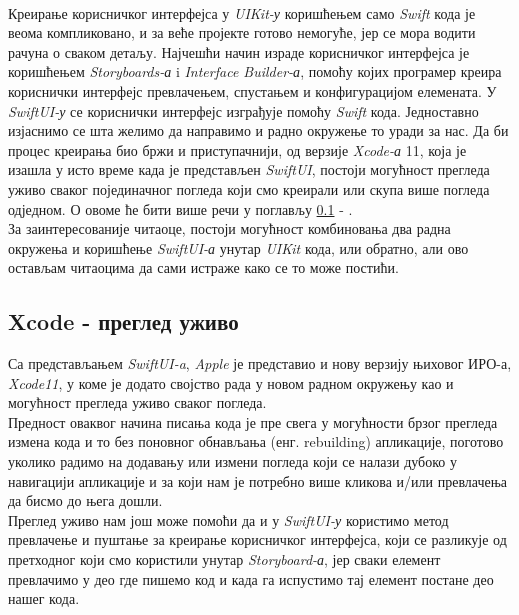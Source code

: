 \documentclass[12pt,oneside]{memoir}
\begin{document}
\\
\indent Креирање корисничког интерфејса у \textit{UIKit-у} коришћењем само \textit{Swift} кода је веома компликовано, и за веће пројекте готово немогуће, јер се мора водити рачуна о сваком детаљу. Најчешћи начин израде корисничког интерфејса је коришћењем \textit{Storyboards-а} i \textit{Interface Builder-а}, помоћу којих програмер креира кориснички интерфејс превлачењем, спустањем и конфигурацијом елемената. У \textit{SwiftUI-у} се кориснички интерфејс изграђује помоћу \textit{Swift} кода. Једноставно изјаснимо се шта желимо да направимо и радно окружење то уради за нас. Да би процес креирања био бржи и приступачнији, од верзије \textit{Xcode-а} 11, која је изашла у исто време када је представљен \textit{SwiftUI}, постоји могућност прегледа уживо сваког појединачног погледа који смо креирали или скупа више погледа одједном. О овоме ће бити више речи у поглављу \ref{subsec:Xcode - преглед уживо} - .
\\
\indent За заинтересованије читаоце, постоји могућност комбиновања два радна окружења и коришћење \textit{SwiftUI-а} унутар \textit{UIKit} кода, или обратно, али ово остављам читаоцима да сами истраже како се то може постићи.

\subsection{Xcode - преглед уживо}
\label{subsec:Xcode - преглед уживо}

\indent Са представљањем \textit{SwiftUI-a}, \textit{Apple} је представио и нову верзију њиховог ИРО-а, \textit{Xcode11}, у коме је додато својство рада у новом радном окружењу као и могућност прегледа уживо сваког погледа. 
\\
\indent Предност оваквог начина писања кода је пре свега у могућности брзог прегледа измена кода и то без поновног обнављања (енг. rebuilding) апликације, поготово уколико радимо на додавању или измени погледа који се налази дубоко у навигацији апликације и за који нам је потребно више кликова и/или превлачења да бисмо до њега дошли. 
\\
\indent Преглед уживо нам још може помоћи да и у \textit{SwiftUI-у} користимо метод превлачење и пуштање за креирање корисничког интерфејса, који се разликује од претходног који смо користили унутар \textit{Storyboard-а}, јер сваки елемент превлачимо у део где пишемо код и када га испустимо тај елемент постане део нашег кода. 
\end{document}
